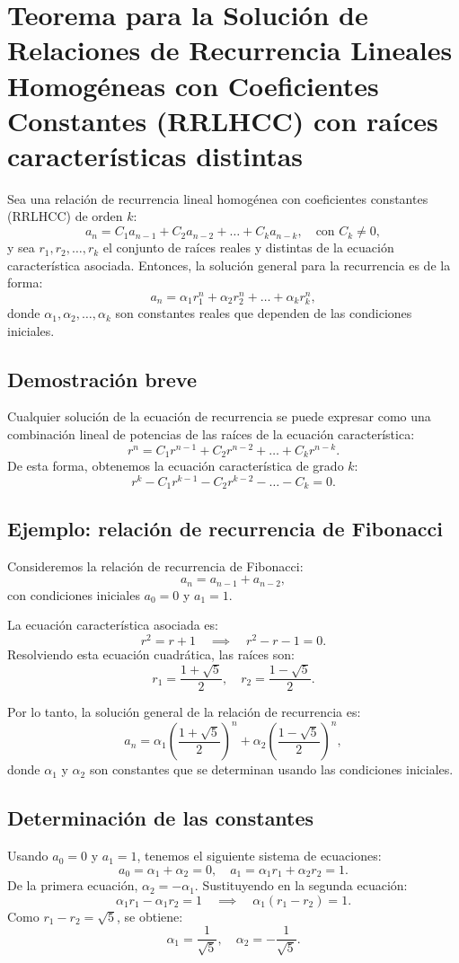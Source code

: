 \documentclass{article}
\begin{document}
\newpage

\section{Teorema para la Solución de Relaciones de Recurrencia Lineales Homogéneas con Coeficientes Constantes (RRLHCC) con raíces características distintas}
Sea una relación de recurrencia lineal homogénea con coeficientes constantes (RRLHCC) de orden $k$:
\[
a_n = C_1a_{n-1} + C_2a_{n-2} + \dots + C_ka_{n-k}, \quad \text{con } C_k \neq 0,
\]
y sea $r_1, r_2, \dots, r_k$ el conjunto de raíces reales y distintas de la ecuación característica asociada. Entonces, la solución general para la recurrencia es de la forma:
\[
a_n = \alpha_1 r_1^n + \alpha_2 r_2^n + \dots + \alpha_k r_k^n,
\]
donde $\alpha_1, \alpha_2, \dots, \alpha_k$ son constantes reales que dependen de las condiciones iniciales.

\subsection{Demostración breve}
Cualquier solución de la ecuación de recurrencia se puede expresar como una combinación lineal de potencias de las raíces de la ecuación característica:
\[
r^n = C_1 r^{n-1} + C_2 r^{n-2} + \dots + C_k r^{n-k}.
\]
De esta forma, obtenemos la ecuación característica de grado $k$:
\[
r^k - C_1 r^{k-1} - C_2 r^{k-2} - \dots - C_k = 0.
\]

\subsection{Ejemplo: relación de recurrencia de Fibonacci}
Consideremos la relación de recurrencia de Fibonacci:
\[
a_n = a_{n-1} + a_{n-2},
\]
con condiciones iniciales $a_0 = 0$ y $a_1 = 1$.

La ecuación característica asociada es:
\[
r^2 = r + 1 \quad \implies \quad r^2 - r - 1 = 0.
\]
Resolviendo esta ecuación cuadrática, las raíces son:
\[
r_1 = \frac{1 + \sqrt{5}}{2}, \quad r_2 = \frac{1 - \sqrt{5}}{2}.
\]

Por lo tanto, la solución general de la relación de recurrencia es:
\[
a_n = \alpha_1 \left( \frac{1 + \sqrt{5}}{2} \right)^n + \alpha_2 \left( \frac{1 - \sqrt{5}}{2} \right)^n,
\]
donde $\alpha_1$ y $\alpha_2$ son constantes que se determinan usando las condiciones iniciales.

\subsection{Determinación de las constantes}
Usando $a_0 = 0$ y $a_1 = 1$, tenemos el siguiente sistema de ecuaciones:
\[
a_0 = \alpha_1 + \alpha_2 = 0, \quad a_1 = \alpha_1 r_1 + \alpha_2 r_2 = 1.
\]
De la primera ecuación, $\alpha_2 = -\alpha_1$. Sustituyendo en la segunda ecuación:
\[
\alpha_1 r_1 - \alpha_1 r_2 = 1 \quad \implies \quad \alpha_1 (r_1 - r_2) = 1.
\]
Como $r_1 - r_2 = \sqrt{5}$, se obtiene:
\[
\alpha_1 = \frac{1}{\sqrt{5}}, \quad \alpha_2 = -\frac{1}{\sqrt{5}}.
\]
\end{document}
